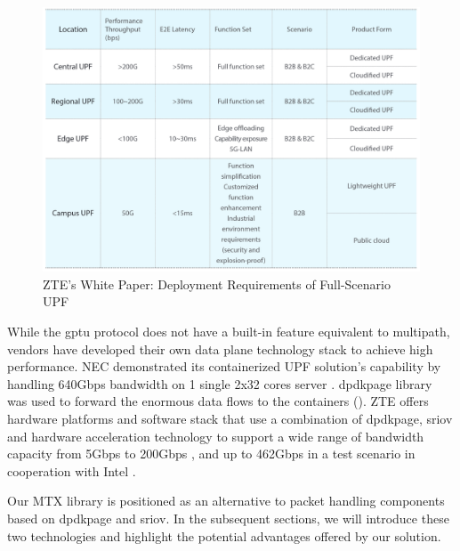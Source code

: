 \begin{figure}[H]
	\centering
	\includegraphics[width=1.0\textwidth]{resources/images/Deployment_Requirements_of_Full_Scenario_UPF.PNG}
	\caption{ZTE's White Paper: Deployment Requirements of Full-Scenario UPF \cite{zte_upf_full_whitepaper}}
    \label{fig:related_work:Deployment_Requirements_of_Full_Scenario_UPF}
\end{figure}

While the \ac{gptu} protocol does not have a built-in feature equivalent to multipath, vendors have developed their own data plane technology stack to achieve high performance.
\ac{NEC} demonstrated its containerized \ac{UPF} solution's capability by handling 640Gbps bandwidth on 1 single 2x32 cores server \cite{nec_upf_whitepaper}.
\ac{dpdkpage} library was used to forward the enormous data flows to the containers ().
\ac{ZTE} offers hardware platforms and software stack that use a combination of \ac{dpdkpage}, \ac{sriov} and hardware acceleration technology to support a wide range of bandwidth capacity from 5Gbps to 200Gbps \cite{zte_upf_full_whitepaper}, and up to 462Gbps in a test scenario in cooperation with Intel \cite{zte_5g_core_upf_impl}.

Our \ac{MTX} library is positioned as an alternative to packet handling components based on \ac{dpdkpage} and \ac{sriov}. 
In the subsequent sections, we will introduce these two technologies and highlight the potential advantages offered by our solution.

